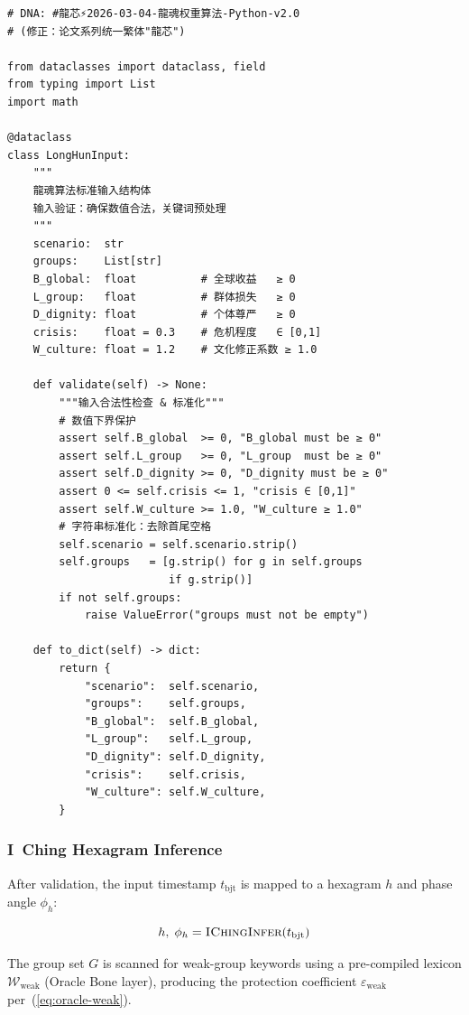 \documentclass[conference]{IEEEtran}
\begin{document}
\begin{lstlisting}[style=python,
  caption={龍魂输入验证与预处理},
  label={lst:input}]
# DNA: #龍芯⚡️2026-03-04-龍魂权重算法-Python-v2.0
# (修正：论文系列统一繁体"龍芯")

from dataclasses import dataclass, field
from typing import List
import math

@dataclass
class LongHunInput:
    """
    龍魂算法标准输入结构体
    输入验证：确保数值合法，关键词预处理
    """
    scenario:  str
    groups:    List[str]
    B_global:  float          # 全球收益   ≥ 0
    L_group:   float          # 群体损失   ≥ 0
    D_dignity: float          # 个体尊严   ≥ 0
    crisis:    float = 0.3    # 危机程度   ∈ [0,1]
    W_culture: float = 1.2    # 文化修正系数 ≥ 1.0

    def validate(self) -> None:
        """输入合法性检查 & 标准化"""
        # 数值下界保护
        assert self.B_global  >= 0, "B_global must be ≥ 0"
        assert self.L_group   >= 0, "L_group  must be ≥ 0"
        assert self.D_dignity >= 0, "D_dignity must be ≥ 0"
        assert 0 <= self.crisis <= 1, "crisis ∈ [0,1]"
        assert self.W_culture >= 1.0, "W_culture ≥ 1.0"
        # 字符串标准化：去除首尾空格
        self.scenario = self.scenario.strip()
        self.groups   = [g.strip() for g in self.groups
                         if g.strip()]
        if not self.groups:
            raise ValueError("groups must not be empty")

    def to_dict(self) -> dict:
        return {
            "scenario":  self.scenario,
            "groups":    self.groups,
            "B_global":  self.B_global,
            "L_group":   self.L_group,
            "D_dignity": self.D_dignity,
            "crisis":    self.crisis,
            "W_culture": self.W_culture,
        }
\end{lstlisting}

\subsubsection{I~Ching Hexagram Inference}

After validation, the input timestamp $t_{\text{bjt}}$
is mapped to a hexagram $h$ and phase angle $\phi_h$:

\begin{equation}
  h,\;\phi_h = \textsc{IChingInfer}(t_{\text{bjt}})
  \label{eq:hexagram-infer}
\end{equation}

The group set $G$ is scanned for weak-group keywords
using a pre-compiled lexicon
$\mathcal{W}_{\text{weak}}$ (Oracle Bone layer),
producing the protection coefficient
$\varepsilon_{\text{weak}}$ per~(\ref{eq:oracle-weak}).
\end{document}
